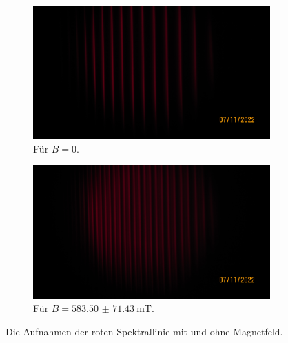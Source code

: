   \begin{figure}%
    \begin{subfigure}{0.48\textwidth}%
      \centering%
      \includegraphics[width=\textwidth]{pictures/IMG_0005.JPG}%
      \caption{Für $B = \num{0}$.}%
      \label{fig:pic_rot_0}%
    \end{subfigure}%
    \hfill%
    \begin{subfigure}{0.48\textwidth}%
      \centering%
      \includegraphics[width=\textwidth]{pictures/IMG_0006.JPG}%
      \caption{Für $B = \SI{583.50(7143)}{\milli\tesla}$.}%
      \label{fig:pic_rot_B}%
    \end{subfigure}%
    \caption{Die Aufnahmen der roten Spektrallinie mit und ohne Magnetfeld.}%
    \label{fig:rot}%
  \end{figure}

